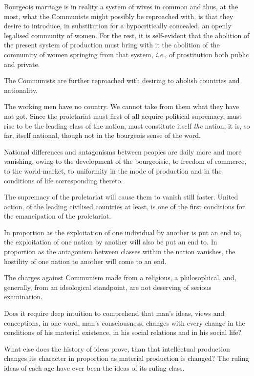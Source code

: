 Bourgeois marriage is in reality a system of wives in common and thus,
at the most, what the Communists might possibly be reproached with, is
that they desire to introduce, in substitution for a hypocritically
concealed, an openly legalised community of women. For the rest, it is
self-evident that the abolition of the present system of production
must bring with it the abolition of the community of women springing
from that system, \textit{i.e.}, of prostitution both public and private.

The Communists are further reproached with desiring to abolish
countries and nationality.

The working men have no country. We cannot take from them what they
have not got. Since the proletariat must first of all acquire political
supremacy, must rise to be the leading class of the nation, must
constitute itself \textit{the} nation, it is, so far, itself national, though
not in the bourgeois sense of the word.

National differences and antagonisms between peoples are daily more and
more vanishing, owing to the development of the bourgeoisie, to freedom
of commerce, to the world-market, to uniformity in the mode of
production and in the conditions of life corresponding thereto.

The supremacy of the proletariat will cause them to vanish still
faster. United action, of the leading civilised countries at least, is
one of the first conditions for the emancipation of the proletariat.

In proportion as the exploitation of one individual by another is put
an end to, the exploitation of one nation by another will also be put
an end to. In proportion as the antagonism between classes within the
nation vanishes, the hostility of one nation to another will come to an
end.

The charges against Communism made from a religious, a philosophical,
and, generally, from an ideological standpoint, are not deserving of
serious examination.

Does it require deep intuition to comprehend that man’s ideas, views
and conceptions, in one word, man’s consciousness, changes with every
change in the conditions of his material existence, in his social
relations and in his social life?

What else does the history of ideas prove, than that intellectual
production changes its character in proportion as material production
is changed? The ruling ideas of each age have ever been the ideas of
its ruling class.


